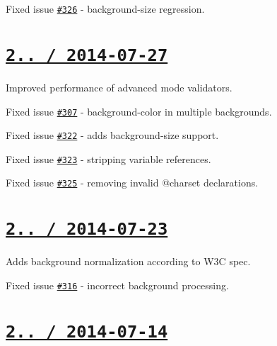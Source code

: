\begin{DoxyItemize}
\item Fixed issue \href{https://github.com/jakubpawlowicz/clean-css/issues/326}{\tt \#326} -\/ {\ttfamily background-\/size} regression.
\end{DoxyItemize}

\section*{\href{https://github.com/jakubpawlowicz/clean-css/compare/v2.2.9...v2.2.10}{\tt 2.. / 2014-\/07-\/27} }


\begin{DoxyItemize}
\item Improved performance of advanced mode validators.
\item Fixed issue \href{https://github.com/jakubpawlowicz/clean-css/issues/307}{\tt \#307} -\/ {\ttfamily background-\/color} in multiple backgrounds.
\item Fixed issue \href{https://github.com/jakubpawlowicz/clean-css/issues/322}{\tt \#322} -\/ adds {\ttfamily background-\/size} support.
\item Fixed issue \href{https://github.com/jakubpawlowicz/clean-css/issues/323}{\tt \#323} -\/ stripping variable references.
\item Fixed issue \href{https://github.com/jakubpawlowicz/clean-css/issues/325}{\tt \#325} -\/ removing invalid {\ttfamily @charset} declarations.
\end{DoxyItemize}

\section*{\href{https://github.com/jakubpawlowicz/clean-css/compare/v2.2.8...v2.2.9}{\tt 2.. / 2014-\/07-\/23} }


\begin{DoxyItemize}
\item Adds {\ttfamily background} normalization according to W3C spec.
\item Fixed issue \href{https://github.com/jakubpawlowicz/clean-css/issues/316}{\tt \#316} -\/ incorrect {\ttfamily background} processing.
\end{DoxyItemize}

\section*{\href{https://github.com/jakubpawlowicz/clean-css/compare/v2.2.7...v2.2.8}{\tt 2.. / 2014-\/07-\/14} }


